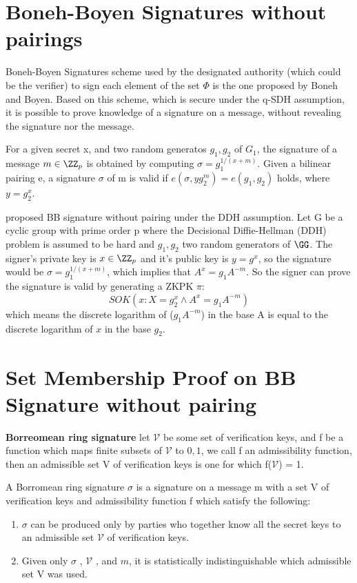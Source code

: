 \section{Boneh-Boyen Signatures without pairings}
\label{appendex: bbs-no-pairing}
Boneh-Boyen Signatures scheme \cite{jao2009boneh} used by the designated authority
(which could be the verifier) to sign each element of the set $\Phi$ is the one proposed by Boneh and Boyen.
Based on this scheme, which is secure under the q-SDH assumption, it is possible to prove knowledge of a
signature on a message, without revealing the signature nor the message.

For a given secret x, and two random generatos $g_1, g_2$ of $G_1$, the signature of a message $m \in \ZZ_p$ is obtained by computing $\sigma = g_1^{1/(x+m)}$. Given a bilinear pairing e, a signature $\sigma$ of m is valid if $e(\sigma, yg_2^m) = e(g_1, g_2)$ holds, where $y = g_2^x$.

\cite{arfaoui2015practical} proposed BB signature without pairing under the DDH assumption. Let G be a cyclic group with prime order p where the
Decisional Diffie-Hellman (DDH) problem is assumed to be hard and $g_1, g_2$ two random generators of $\GG$. The signer’s private key is $x \in \ZZ_p$ and it's public key is $y = g^x$, so the signature would be $\sigma = g_1^{1/(x+m)}$, which implies that $A^x = g_1 A^{-m}$. So the signer can prove the signature is valid by generating a ZKPK $\pi$:
\begin{equation}
    SOK(x: X = g_2^x \land A^x = g_1A^{-m})
\end{equation}
which means the discrete logarithm of ($g_1 A^{-m}$) in the base A is equal to the discrete logarithm of $x$ in the base $g_2$.

\section{Set Membership Proof on BB Signature without pairing}

\begin{myDef}
\label{d5}
\textbf{Borreomean ring signature\cite{maxwell2015borromean}} let $\mathcal{V}$ be some set of verification keys, and f be a function which maps finite subsets of $\mathcal{V}$ to ${0, 1}$, we call f an admissibility function, then an admissible set V of verification keys is one for which f($\mathcal{V}$) = 1. 

A Borromean ring signature $\sigma$ is a signature on a message m with a set V of verification keys and admissibility function f which satisfy the following:
\begin{enumerate}
    \item $\sigma$ can be produced only by parties who together know all the secret keys to an admissible set $\mathcal{V}$ of verification keys.
    \item Given only $\sigma$ , $\mathcal{V}$ , and $m$, it is statistically indistinguishable which admissible set V was used.
\end{enumerate}
\end{myDef}

